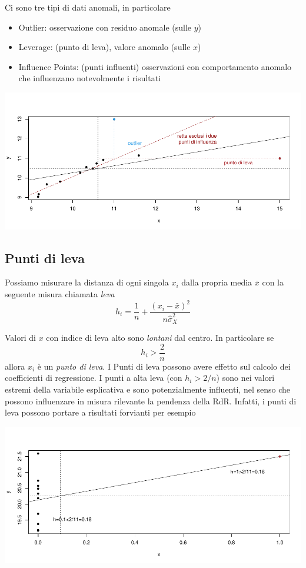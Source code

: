 \documentclass[
  11pt,
]{book}
\providecommand{\tightlist}{%
  \setlength{\itemsep}{0pt}\setlength{\parskip}{0pt}}
\theoremstyle{mytheoremstyle}
\theoremstyle{mydefstyle}
\begin{document}
Ci sono tre tipi di dati anomali, in particolare

\begin{itemize}
\tightlist
\item
  Outlier: osservazione con residuo anomale (sulle \(y\))
\item
  Leverage: (punto di leva), valore anomalo (sulle \(x\))
\item
  Influence Points: (punti influenti) osservazioni con
  comportamento anomalo che influenzano
  notevolmente i risultati
\end{itemize}

\begin{center}\includegraphics{Appunti_di_Statistica_2025_files/figure-latex/18-regressione-II-24-1} \end{center}

\subsection{Punti di leva}\label{punti-di-leva}

Possiamo misurare la distanza di ogni singola \(x_i\) dalla propria media \(\bar x\) con la seguente misura
chiamata \emph{leva}
\[
h_{i} = \frac{1} {n} + \frac{(x_{i} - \bar{x})^{2}} {n \hat\sigma_{X}^{2}}
\]

Valori di \(x\) con indice di leva alto sono \emph{lontani} dal centro.
In particolare se
\[h_i>\frac 2 n\]
allora \(x_i\) è un \emph{punto di leva}.
I Punti di leva possono avere effetto sul calcolo dei coefficienti di regressione.
I punti a alta leva (con \(h_{i} > 2/n\)) sono nei
valori estremi della variabile esplicativa e sono potenzialmente
influenti, nel senso che possono influenzare in misura rilevante
la pendenza della RdR.
Infatti, i punti di leva possono portare a risultati forvianti per esempio

\begin{center}\includegraphics{Appunti_di_Statistica_2025_files/figure-latex/18-regressione-II-25-1} \end{center}
\end{document}
